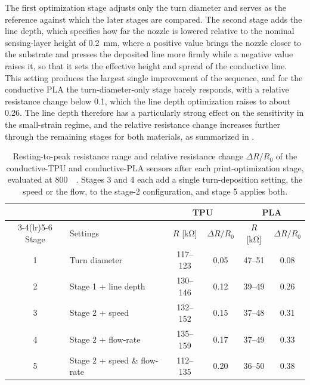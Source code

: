 The first optimization stage adjusts only the turn diameter and serves as the reference against which the later stages are compared. The second stage adds the line depth, which specifies how far the nozzle is lowered relative to the nominal sensing-layer height of \SI{0.2}{\milli\meter}, where a positive value brings the nozzle closer to the substrate and presses the deposited line more firmly while a negative value raises it, so that it sets the effective height and spread of the conductive line. This setting produces the largest single improvement of the sequence, and for the conductive PLA the turn-diameter-only stage barely responds, with a relative resistance change below \num{0.1}, which the line depth optimization raises to about \num{0.26}. The line depth therefore has a particularly strong effect on the sensitivity in the small-strain regime, and the relative resistance change increases further through the remaining stages for both materials, as summarized in .

\begin{table}
\centering
\caption{Resting-to-peak resistance range and relative resistance change $\Delta R/R_0$ of the conductive-TPU and conductive-PLA sensors after each print-optimization stage, evaluated at \SI{800}{\micro\strain}. Stages 3 and 4 each add a single turn-deposition setting, the speed or the flow, to the stage-2 configuration, and stage 5 applies both.}
\label{tab:opt_results}
\begin{tabular}{@{}c l c c c c@{}}
\toprule
 & & \multicolumn{2}{c}{TPU} & \multicolumn{2}{c}{PLA} \\
\cmidrule(lr){3-4}\cmidrule(lr){5-6}
Stage & Settings & $R$ [\si{\kilo\ohm}] & $\Delta R/R_0$ & $R$ [\si{\kilo\ohm}] & $\Delta R/R_0$ \\
\midrule
1 & Turn diameter  & 117--123 & 0.05 & 47--51 & 0.08 \\
2 & Stage 1 + line depth     & 130--146 & 0.12 & 39--49 & 0.26 \\
3 & Stage 2 + speed          & 132--152 & 0.15 & 37--48 & 0.31 \\
4 & Stage 2 + flow-rate      & 135--159 & 0.17 & 37--49 & 0.33 \\
5 & Stage 2 + speed \& flow-rate & 112--135 & 0.20 & 36--50 & 0.38 \\
\bottomrule
\end{tabular}
\end{table}

